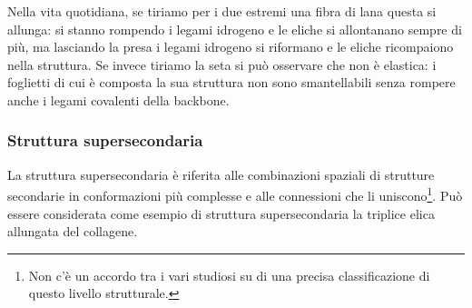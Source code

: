 {{\par Nella vita quotidiana, se tiriamo per i due estremi una fibra di lana questa si allunga: si stanno rompendo i legami idrogeno e le eliche si allontanano sempre di più, ma lasciando la presa i legami idrogeno si riformano e le eliche ricompaiono nella struttura. Se invece tiriamo la seta si può osservare che non è elastica: i foglietti di cui è composta la sua struttura non sono smantellabili senza rompere anche i legami covalenti della backbone.

}
\subsubsection{Struttura supersecondaria}
{
La struttura supersecondaria è riferita alle combinazioni spaziali di strutture secondarie in conformazioni più complesse e alle connessioni che li uniscono\footnote{Non c'è un accordo tra i vari studiosi su di una precisa classificazione di questo livello strutturale.}. Può essere considerata come esempio di struttura supersecondaria la triplice elica allungata del collagene.

}}
